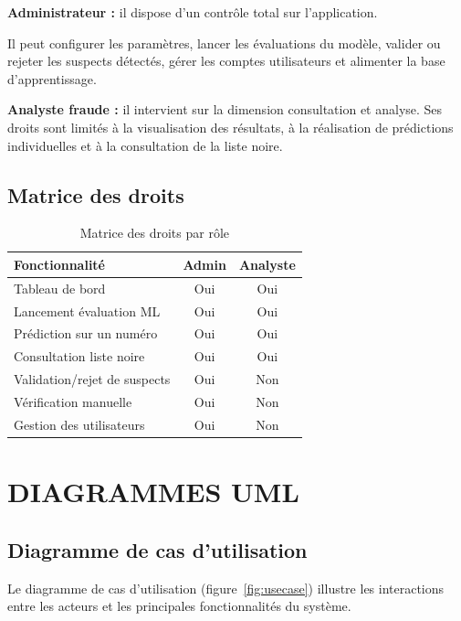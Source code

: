 \documentclass[12pt, oneside, a4paper]{report}
\begin{document}
\textbf{Administrateur :} il dispose d’un contrôle total sur l’application.

Il peut configurer les paramètres, lancer les évaluations du modèle, valider ou rejeter les suspects détectés, gérer les comptes utilisateurs et alimenter la base d’apprentissage.

\textbf{Analyste fraude :} il intervient sur la dimension consultation et analyse. Ses droits sont limités à la visualisation des résultats, à la réalisation de prédictions individuelles et à la consultation de la liste noire.


\subsection{Matrice des droits}
\begin{table}[h!]
\centering
\caption{Matrice des droits par rôle}
\label{tab:droits}
\vspace{0.3cm}
\renewcommand{\arraystretch}{1.3}
\begin{tabular}{|l|c|c|}
\hline
\textbf{Fonctionnalité} & \textbf{Admin} & \textbf{Analyste} \\
\hline
Tableau de bord & Oui & Oui \\
\hline
Lancement évaluation ML & Oui & Oui \\
\hline
Prédiction sur un numéro & Oui & Oui \\
\hline
Consultation liste noire & Oui & Oui \\
\hline
Validation/rejet de suspects & Oui & Non \\
\hline
Vérification manuelle & Oui & Non \\
\hline
Gestion des utilisateurs & Oui & Non \\
\hline
\end{tabular}
\end{table}



\section{DIAGRAMMES UML}

\subsection{Diagramme de cas d'utilisation}
Le diagramme de cas d'utilisation (figure~\ref{fig:usecase}) illustre les interactions entre les acteurs et les principales fonctionnalités du système.
\end{document}
